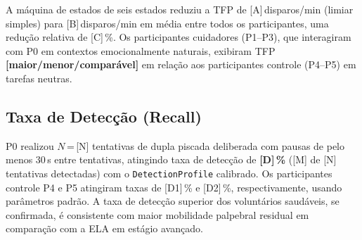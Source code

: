 A máquina de estados de seis estados reduziu a TFP de [A]\,disparos/min (limiar
simples) para [B]\,disparos/min em média entre todos os participantes, uma redução
relativa de [C]\,\%. Os participantes cuidadores (P1--P3), que interagiram com P0 em
contextos emocionalmente naturais, exibiram TFP \textbf{[maior/menor/comparável]} em
relação aos participantes controle (P4--P5) em tarefas neutras.

\subsection{Taxa de Detecção (Recall)}
\label{sec:taxadeteccao}

P0 realizou $N$\,=\,[N] tentativas de dupla piscada deliberada com pausas de pelo
menos 30\,s entre tentativas, atingindo taxa de detecção de \textbf{[D]\,\%} ([M] de
[N] tentativas detectadas) com o \texttt{DetectionProfile} calibrado. Os participantes
controle P4 e P5 atingiram taxas de [D1]\,\% e [D2]\,\%, respectivamente, usando
parâmetros padrão. A taxa de detecção superior dos voluntários saudáveis, se
confirmada, é consistente com maior mobilidade palpebral residual em comparação com
a ELA em estágio avançado.

